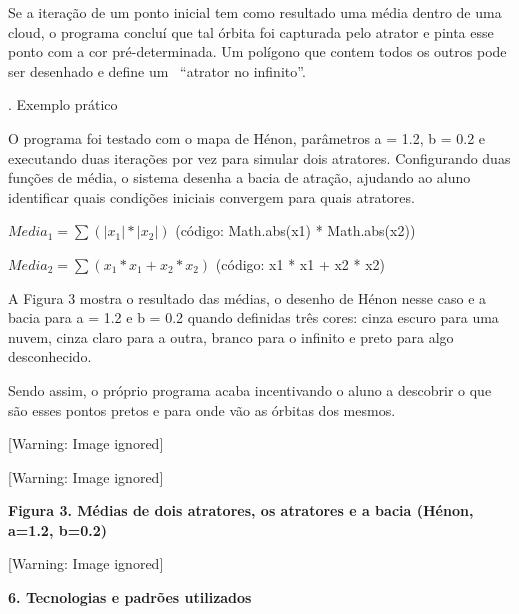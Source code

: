 \documentclass[a4paper,12pt]{article}
\begin{document}
{
 Se a itera\c{c}\~ao de um ponto inicial tem como resultado uma m\'edia
dentro de uma cloud, o programa conclu\'i que tal \'orbita foi
capturada pelo atrator e pinta esse ponto com a cor
pr\'e{}-determinada. Um pol\'igono que contem todos os outros pode ser
desenhado e define um \ ``atrator no infinito''.}

{. Exemplo pr\'atico}

{
O programa foi testado com o mapa de H\'enon, par\^ametros a = 1.2, b =
0.2 e executando duas itera\c{c}\~oes por vez para simular dois
atratores. Configurando duas fun\c{c}\~oes de m\'edia, o sistema
desenha a bacia de atra\c{c}\~ao, ajudando ao aluno identificar quais
condi\c{c}\~oes iniciais convergem para quais atratores.}

{
  $\mathit{Media}_{1}=\sum {(\left|{x_{1}}\right|\ast
\left|{x_{2}}\right|)}$ (c\'odigo: Math.abs(x1) * Math.abs(x2))}

{
  $\mathit{Media}_{2}=\sum {(x_{1}\ast x_{1}+x_{2}\ast x_{2})}$
(c\'odigo: x1 * x1 + x2 * x2)}

{
 A Figura 3 mostra o resultado das m\'edias, o desenho de H\'enon nesse
caso e a bacia para a = 1.2 e b = 0.2 quando definidas tr\^es cores:
cinza escuro para uma nuvem, cinza claro para a outra, branco para o
infinito e preto para algo desconhecido.}

{
 Sendo assim, o pr\'oprio programa acaba incentivando o aluno a
descobrir o que s\~ao esses pontos pretos e para onde v\~ao as
\'orbitas dos mesmos.}

\begin{center}
 [Warning: Image ignored] %

\end{center}
\begin{center}
 [Warning: Image ignored] %

\end{center}
{\centering{}\sffamily\bfseries
\textrm{\textmd{Figura 3. M\'edias de dois atratores, os atratores e a
bacia (H\'enon, a=1.2, b=0.2)}}
\par}

\begin{center}
 [Warning: Image ignored] %

\end{center}
{\bfseries
6. Tecnologias e padr\~oes utilizados}
\end{document}
